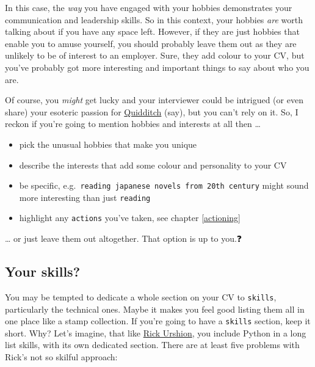 \documentclass[
]{book}
\providecommand{\tightlist}{%
  \setlength{\itemsep}{0pt}\setlength{\parskip}{0pt}}
\begin{document}
In this case, the \emph{way} you have engaged with your hobbies demonstrates your communication and leadership skills. So in this context, your hobbies \emph{are} worth talking about if you have any space left. However, if they are just hobbies that enable you to amuse yourself, you should probably leave them out as they are unlikely to be of interest to an employer. Sure, they add colour to your CV, but you've probably got more interesting and important things to say about who you are.

Of course, you \emph{might} get lucky and your interviewer could be intrigued (or even share) your esoteric passion for \href{https://en.wikipedia.org/wiki/Quidditch_(real-life_sport)}{Quidditch} (say), but you can't rely on it. So, I reckon if you're going to mention hobbies and interests at all then \ldots{}

\begin{itemize}
\tightlist
\item
  pick the unusual hobbies that make you unique
\item
  describe the interests that add some colour and personality to your CV
\item
  be specific, e.g.~\texttt{reading\ japanese\ novels\ from\ 20th\ century} might sound more interesting than just \texttt{reading}
\item
  highlight any \texttt{actions} you've taken, see chapter \ref{actioning}
\end{itemize}

\ldots{} or just leave them out altogether. That option is up to you.❓

\hypertarget{mycvsk}{%
\subsection{Your skills?}\label{mycvsk}}

You may be tempted to dedicate a whole section on your CV to \texttt{skills}, particularly the technical ones. Maybe it makes you feel good listing them all in one place like a stamp collection. If you're going to have a \texttt{skills} section, keep it short. Why? Let's imagine, that like \href{Rick_Urshion.pdf}{Rick Urshion}, you include Python in a long list skills, with its own dedicated section. There are at least five problems with Rick's not so skilful approach:
\end{document}
